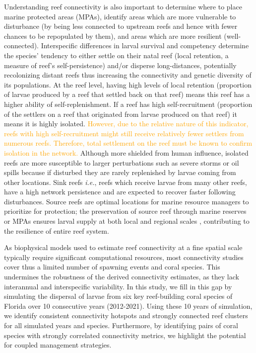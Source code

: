 \documentclass[preprint,12pt,authoryear]{elsarticle}
\newcommand{\added}[1]{\textcolor{orange}{#1}}
\begin{document}
	Understanding reef connectivity is also important to determine where to place marine protected areas (MPAs), identify areas which are more vulnerable to disturbance (by being less connected to upstream reefs and hence with fewer chances to be repopulated by them), and areas which are more resilient (well-connected). Interspecific differences in larval survival and competency determine the species’ tendency to either settle on their natal reef (local retention, a measure of reef’s self-persistence) and/or disperse long-distances, potentially recolonizing distant reefs thus increasing the connectivity and genetic diversity of its populations. At the reef level, having high levels of local retention (proportion of larvae produced by a reef that settled back on that reef) means this reef has a higher ability of self-replenishment. If a reef has high self-recruitment (proportion of the settlers on a reef that originated from larvae produced on that reef) it means it is highly isolated. \added{However, due to the relative nature of this indicator, reefs with high self-recruitment might still receive relatively fewer settlers from numerous reefs. Therefore, total settlement on the reef must be known to confirm isolation in the network.}  Although more shielded from human influence, isolated reefs are more susceptible to larger perturbations such as severe storms or oil spills \citep{baumann2022remoteness} because if disturbed they are rarely replenished by larvae coming from other locations. Sink reefs \textit{i.e.}, reefs which receive larvae from many other reefs, have a high network persistence and are expected to recover faster following disturbances. Source reefs are optimal locations for marine resource managers to prioritize for protection; the preservation of source reef through marine reserves or MPAs ensures larval supply at both local and regional scales \citep{muenzel2023integrating}, contributing to the resilience of entire reef system.
	
	As biophysical models used to estimate reef connectivity at a fine spatial scale typically require significant computational resources, most connectivity studies cover thus a limited number of spawning events and coral species. This undermines the robustness of the derived connectivity estimates, as they lack interannual and interspecific variability. In this study, we fill in this gap by simulating the dispersal of larvae from six key reef-building coral species of Florida over 10 consecutive years (2012-2021). Using these 10 years of simulation, we identify consistent connectivity hotspots and strongly connected reef clusters for all simulated years and species. Furthermore, by identifying pairs of coral species with strongly correlated connectivity metrics, we highlight the potential for coupled management strategies.
	
\end{document}
